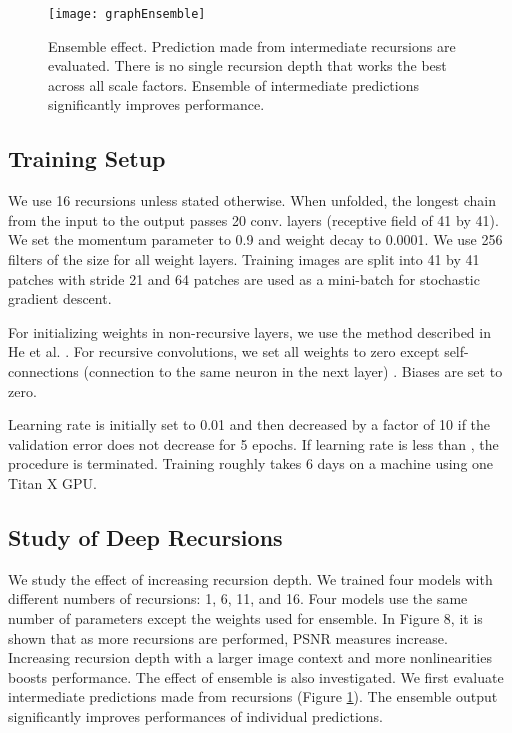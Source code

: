 \documentclass[10pt,twocolumn,letterpaper]{article}
\begin{document}
\begin{figure}
\centering
{\graphicspath{{figs/graph1/}}\texttt{[image: graphEnsemble]}}
\caption{Ensemble effect. Prediction made from intermediate recursions are evaluated. There is no single recursion depth that works the best across all scale factors. Ensemble of intermediate predictions significantly improves performance. }
\label{fig:ensemble}
\end{figure}

\subsection{Training Setup}


We use 16 recursions unless stated otherwise. When unfolded, the longest chain from the input to the output passes 20 conv. layers (receptive field of 41 by 41). We set the momentum parameter to 0.9 and weight decay to 0.0001. We use 256 filters of the size  for all weight layers. Training images are split into 41 by 41 patches with stride 21 and 64 patches are used as a mini-batch for stochastic gradient descent. 

For initializing weights in non-recursive layers, we use the method described in He et al. \cite{he2015delving}. For recursive convolutions, we set all weights to zero except self-connections (connection to the same neuron in the next layer) \cite{socher2012semantic, le2015simple}.  Biases are set to zero.

Learning rate is initially set to 0.01 and then decreased by a factor of 10 if the validation error does not decrease for 5 epochs. If learning rate is less than , the procedure is terminated. Training roughly takes 6 days on a machine using one Titan X GPU. 

\subsection{Study of Deep Recursions}
We study the effect of increasing recursion depth. We trained four models with different numbers of recursions: 1, 6, 11, and 16. Four models use the same number of parameters except the weights used for ensemble. In Figure {\color{red}8}, it is shown that as more recursions are performed, PSNR measures increase. Increasing recursion depth with a larger image context and more nonlinearities boosts performance. The effect of ensemble is also investigated. We first evaluate intermediate predictions made from recursions (Figure \ref{fig:ensemble}). The ensemble output significantly improves performances of individual predictions. 
\end{document}
